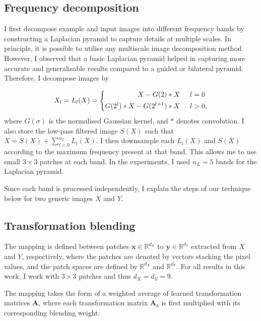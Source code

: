\subsection{Frequency decomposition}\label{sec:thePatchMap}

I first decompose example and input images into different frequency bands by constructing a Laplacian pyramid to capture details at multiple scales. In principle, it is possible to utilise any multiscale image decomposition method. However, I observed that a basic Laplacian pyramid helped in capturing more accurate and generalisable results compared to a guided or bilateral pyramid. Therefore, I decompose images by

\begin{equation} 
	X_l = L_l(X) = 
 \left \{ \begin{aligned}
        X - G(2) \ast X \hspace{5mm} &l=0\\
        G(2^l) \ast X - G(2^{l+1}) \ast X \hspace{5mm} &l>0,
       \end{aligned}
 \right.
\end{equation}
where $G(\sigma)$ is the normalised Gaussian kernel, and $\ast$ denotes convolution. I also store the low-pass filtered image $S(X)$ such that $X = S(X) + \sum_{l=0}^{n_L} L_l(X)$. I then downsample each $L_l(X)$ and $S(X)$ according to the maximum frequency present at that band. This allows me to use small $3 \times 3$ patches at each band. In the experiments, I used $n_L = 5$ bands for the Laplacian pyramid.


Since each band is processed independently, I explain the steps of our technique below for two generic images $X$ and $Y$.


\subsection{Transformation blending}\label{sec:Blending}

The mapping is defined between patches $\mathbf{x} \in \mathbb{R}^{d_X}$ to $\mathbf{y} \in \mathbb{R}^{d_Y}$ extracted from $X$ and $Y$, respectively, where the patches are denoted by vectors stacking the pixel values, and the patch spaces are defined by $\mathbb{R}^{d_X}$ and  $\mathbb{R}^{d_Y}$. For all results in this work, I work with $3 \times 3$ patches and thus $d_X = d_Y = 9$.

The mapping takes the form of a weighted average of learned transformation matrices $\mathbf{A}$, where each transformation matrix $\mathbf{A}_k$ is first multiplied with its corresponding blending weight: 

